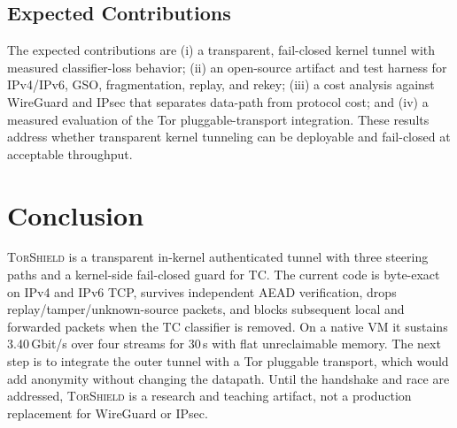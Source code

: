 \documentclass[conference]{IEEEtran}
\newcommand{\sys}{\textsc{TorShield}}
\begin{document}
\subsection{Expected Contributions}
The expected contributions are (i) a transparent, fail-closed kernel tunnel with measured classifier-loss behavior; (ii) an open-source artifact and test harness for IPv4/IPv6, GSO, fragmentation, replay, and rekey; (iii) a cost analysis against WireGuard and IPsec that separates data-path from protocol cost; and (iv) a measured evaluation of the Tor pluggable-transport integration. These results address whether transparent kernel tunneling can be deployable and fail-closed at acceptable throughput.

\section{Conclusion}
\sys{} is a transparent in-kernel authenticated tunnel with three steering paths and a kernel-side fail-closed guard for TC. The current code is byte-exact on IPv4 and IPv6 TCP, survives independent AEAD verification, drops replay/tamper/unknown-source packets, and blocks subsequent local and forwarded packets when the TC classifier is removed. On a native VM it sustains 3.40\,Gbit/s over four streams for 30\,s with flat unreclaimable memory. The next step is to integrate the outer tunnel with a Tor pluggable transport, which would add anonymity without changing the datapath. Until the handshake and race are addressed, \sys{} is a research and teaching artifact, not a production replacement for WireGuard or IPsec.



\end{document}
